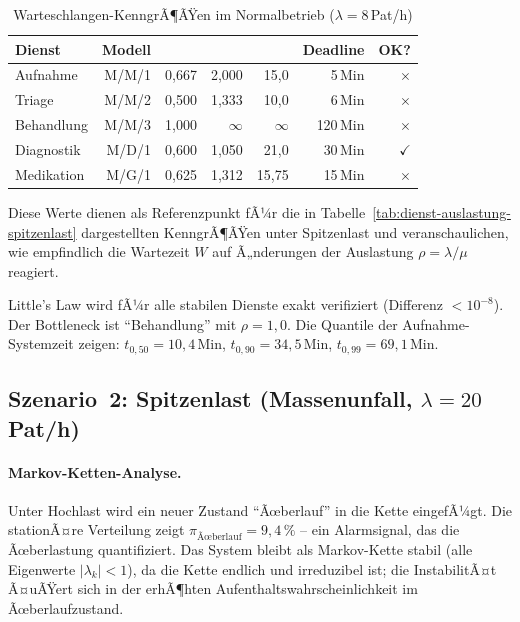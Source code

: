 ﻿\documentclass[a4paper,12pt]{report}
\theoremstyle{definition}
\begin{document}
\begin{table}[H]
	\centering
	\begin{tabular}{@{}lrrrrrr@{}}
		\toprule
		\textbf{Dienst} & \textbf{Modell} & \boldmath{$\rho$} &
		\boldmath{$L$} & \boldmath{$W$\,(Min)} & \textbf{Deadline} & \textbf{OK?} \\
		\midrule
		Aufnahme        & M/M/1   & 0{,}667 & 2{,}000 &  15{,}0 & 5\,Min  & $\times$ \\
		Triage          & M/M/2   & 0{,}500 & 1{,}333 &  10{,}0 & 6\,Min  & $\times$ \\
		Behandlung      & M/M/3   & 1{,}000 & $\infty$& $\infty$& 120\,Min& $\times$ \\
		Diagnostik      & M/D/1   & 0{,}600 & 1{,}050 &  21{,}0 & 30\,Min & $\checkmark$ \\
		Medikation      & M/G/1   & 0{,}625 & 1{,}312 &  15{,}75& 15\,Min & $\times$ \\
		\bottomrule
	\end{tabular}
	\caption{Warteschlangen-KenngrÃ¶ÃŸen im Normalbetrieb ($\lambda=8$\,Pat/h)}
\label{tab:queue-normal}
	\label{tab:wq-normal}
\end{table}

Diese Werte dienen als Referenzpunkt fÃ¼r die in Tabelle~\ref{tab:dienst-auslastung-spitzenlast} dargestellten KenngrÃ¶ÃŸen unter Spitzenlast und veranschaulichen, wie empfindlich die Wartezeit $W$ auf Ã„nderungen der Auslastung $\rho = \lambda/\mu$ reagiert.

Little's Law wird fÃ¼r alle stabilen Dienste exakt verifiziert
(Differenz $< 10^{-8}$). Der Bottleneck ist ``Behandlung'' mit $\rho = 1{,}0$.
Die Quantile der Aufnahme-Systemzeit zeigen:
$t_{0{,}50} = 10{,}4$\,Min, $t_{0{,}90} = 34{,}5$\,Min, $t_{0{,}99} = 69{,}1$\,Min.

\subsection{Szenario~2: Spitzenlast (Massenunfall, $\lambda = 20$\,Pat/h)}

\paragraph{Markov-Ketten-Analyse.}
Unter Hochlast wird ein neuer Zustand ``Ãœberlauf'' in die Kette eingefÃ¼gt.
Die stationÃ¤re Verteilung zeigt $\pi_\text{Ãœberlauf} = 9{,}4\,\%$ --
ein Alarmsignal, das die Ãœberlastung quantifiziert. Das System bleibt
als Markov-Kette stabil (alle Eigenwerte $|\lambda_k| < 1$), da die
Kette endlich und irreduzibel ist; die InstabilitÃ¤t Ã¤uÃŸert sich in der
erhÃ¶hten Aufenthaltswahrscheinlichkeit im Ãœberlaufzustand.
\end{document}
